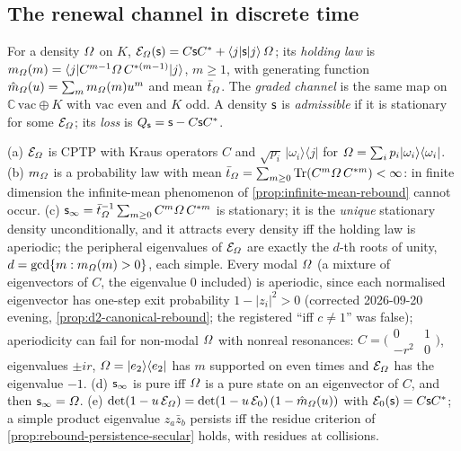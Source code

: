 \subsection{The renewal channel in discrete time}

\begin{definition}
\label{def:cusp-renewal-channel}
For a density $\varOmega$ on $K$, $\mathcal E_{\varOmega}(\mathsf s) = C\mathsf s C^{*} + \langle j|\mathsf s|j\rangle\,\varOmega$;
its \emph{holding law} is $m_{\varOmega}(m) = \langle j|C^{m-1}\varOmega\,C^{*(m-1)}|j\rangle$, $m\ge1$, with generating
function $\hat m_{\varOmega}(u) = \sum_m m_{\varOmega}(m)u^m$ and mean $\bar t_{\varOmega}$. The \emph{graded channel} is the
same map on $\mathbb C\,\mathrm{vac}\oplus K$ with $\mathrm{vac}$ even and $K$ odd. A density $\mathsf s$ is
\emph{admissible} if it is stationary for some $\mathcal E_{\varOmega}$; its \emph{loss} is
$Q_{\mathsf s} = \mathsf s - C\mathsf s C^{*}$.
\end{definition}

\begin{theorem}
\label{thm:cusp-renewal-discrete}
(a) $\mathcal E_{\varOmega}$ is CPTP with Kraus operators $C$ and $\sqrt{p_i}\,|\omega_i\rangle\langle j|$ for
$\varOmega = \sum_ip_i|\omega_i\rangle\langle\omega_i|$. (b) $m_{\varOmega}$ is a probability law with mean
$\bar t_{\varOmega} = \sum_{m\ge0}\mathrm{Tr}(C^m\varOmega\,C^{*m})<\infty$: in finite dimension the infinite-mean
phenomenon of \cref{prop:infinite-mean-rebound} cannot occur. (c) $\mathsf s_\infty = \bar t_{\varOmega}^{-1}\sum_{m\ge0}C^m\varOmega\,C^{*m}$
is stationary; it is the \emph{unique} stationary density unconditionally, and it attracts every density iff
the holding law is aperiodic; the peripheral eigenvalues of $\mathcal E_{\varOmega}$ are exactly the $d$-th roots
of unity, $d = \gcd\{m: m_{\varOmega}(m)>0\}$, each simple. Every modal $\varOmega$ (a mixture of eigenvectors of $C$, the eigenvalue $0$ included) is aperiodic, since each
normalised eigenvector has one-step exit probability $1-|z_i|^2>0$ (corrected 2026-09-20 evening,
\cref{prop:d2-canonical-rebound}; the registered ``iff $c\ne1$'' was false); aperiodicity can fail for non-modal
$\varOmega$ with nonreal resonances:
$C = \big(\begin{smallmatrix}0&1\\-r^2&0\end{smallmatrix}\big)$, eigenvalues $\pm ir$,
$\varOmega = |e_2\rangle\langle e_2|$ has $m$ supported on even times and $\mathcal E_{\varOmega}$ has the eigenvalue $-1$.
(d) $\mathsf s_\infty$ is pure iff $\varOmega$ is a pure state on an eigenvector of $C$, and then $\mathsf s_\infty = \varOmega$.
(e) $\det(1-u\,\mathcal E_{\varOmega}) = \det(1-u\,\mathcal E_0)\,(1-\hat m_{\varOmega}(u))$ with
$\mathcal E_0(\mathsf s) = C\mathsf s C^{*}$; a simple product eigenvalue $z_a\bar z_b$ persists iff the residue
criterion of \cref{prop:rebound-persistence-secular} holds, with residues at collisions.
\end{theorem}

